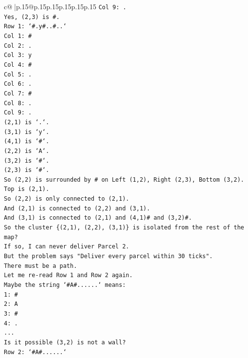 \documentclass{article}
\begin{document}
{\begin{supertabular}{c@{$\;$}|p{.15\linewidth}@{}p{.15\linewidth}p{.15\linewidth}p{.15\linewidth}p{.15\linewidth}p{.15\linewidth}}
{{{\texttt{Col 9: .} \\
\texttt{Yes, (2,3) is \#.} \\
\texttt{Row 1: `\#.y\#..\#..`} \\
\texttt{Col 1: \#} \\
\texttt{Col 2: .} \\
\texttt{Col 3: y} \\
\texttt{Col 4: \#} \\
\texttt{Col 5: .} \\
\texttt{Col 6: .} \\
\texttt{Col 7: \#} \\
\texttt{Col 8: .} \\
\texttt{Col 9: .} \\
\texttt{(2,1) is `.`.} \\
\texttt{(3,1) is `y`.} \\
\texttt{(4,1) is `\#`.} \\
\texttt{(2,2) is `A`.} \\
\texttt{(3,2) is `\#`.} \\
\texttt{(2,3) is `\#`.} \\
\texttt{So (2,2) is surrounded by \# on Left (1,2), Right (2,3), Bottom (3,2).} \\
\texttt{Top is (2,1).} \\
\texttt{So (2,2) is only connected to (2,1).} \\
\texttt{And (2,1) is connected to (2,2) and (3,1).} \\
\texttt{And (3,1) is connected to (2,1) and (4,1)\# and (3,2)\#.} \\
\texttt{So the cluster \{(2,1), (2,2), (3,1)\} is isolated from the rest of the map?} \\
\texttt{If so, I can never deliver Parcel 2.} \\
\texttt{But the problem says "Deliver every parcel within 30 ticks".} \\
\texttt{There must be a path.} \\
\texttt{Let me re{-}read Row 1 and Row 2 again.} \\
\texttt{Maybe the string `\#A\#......` means:} \\
\texttt{1: \#} \\
\texttt{2: A} \\
\texttt{3: \#} \\
\texttt{4: .} \\
\texttt{...} \\
\texttt{Is it possible (3,2) is not a wall?} \\
\texttt{Row 2: `\#A\#......`} \\
}}}
\end{supertabular}}
\end{document}
